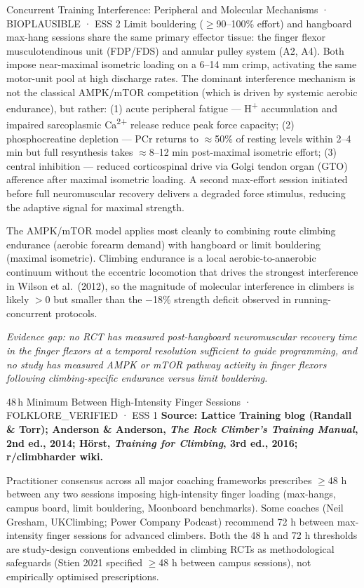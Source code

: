 \begin{bioplausbox}{Concurrent Training Interference: Peripheral and Molecular Mechanisms · BIOPLAUSIBLE · ESS 2}
Limit bouldering ($\geq$90–100\% effort) and hangboard max-hang sessions share the same primary effector tissue: the finger flexor musculotendinous unit (FDP/FDS) and annular pulley system (A2, A4). Both impose near-maximal isometric loading on a 6–14 mm crimp, activating the same motor-unit pool at high discharge rates. The dominant interference mechanism is not the classical AMPK/mTOR competition (which is driven by systemic aerobic endurance), but rather: (1) acute peripheral fatigue — H\textsuperscript{+} accumulation and impaired sarcoplasmic Ca\textsuperscript{2+} release reduce peak force capacity; (2) phosphocreatine depletion — PCr returns to $\approx$50\% of resting levels within 2–4 min but full resynthesis takes $\approx$8–12 min post-maximal isometric effort; (3) central inhibition — reduced corticospinal drive via Golgi tendon organ (GTO) afference after maximal isometric loading. A second max-effort session initiated before full neuromuscular recovery delivers a degraded force stimulus, reducing the adaptive signal for maximal strength.

The AMPK/mTOR model applies most cleanly to combining route climbing endurance (aerobic forearm demand) with hangboard or limit bouldering (maximal isometric). Climbing endurance is a local aerobic-to-anaerobic continuum without the eccentric locomotion that drives the strongest interference in Wilson et al.\ (2012), so the magnitude of molecular interference in climbers is likely $>0$ but smaller than the $-$18\% strength deficit observed in running-concurrent protocols.

\textit{Evidence gap: no RCT has measured post-hangboard neuromuscular recovery time in the finger flexors at a temporal resolution sufficient to guide programming, and no study has measured AMPK or mTOR pathway activity in finger flexors following climbing-specific endurance versus limit bouldering.}
\end{bioplausbox}

\begin{folklorebox}{48\,h Minimum Between High-Intensity Finger Sessions · FOLKLORE\_VERIFIED · ESS 1}
\textbf{Source: Lattice Training blog (Randall \& Torr); Anderson \& Anderson, \textit{The Rock Climber's Training Manual}, 2nd ed., 2014; Hörst, \textit{Training for Climbing}, 3rd ed., 2016; r/climbharder wiki.}

Practitioner consensus across all major coaching frameworks prescribes $\geq$48 h between any two sessions imposing high-intensity finger loading (max-hangs, campus board, limit bouldering, Moonboard benchmarks). Some coaches (Neil Gresham, UKClimbing; Power Company Podcast) recommend 72 h between max-intensity finger sessions for advanced climbers. Both the 48 h and 72 h thresholds are study-design conventions embedded in climbing RCTs as methodological safeguards (Stien 2021 specified $\geq$48 h between campus sessions), not empirically optimised prescriptions.
\end{folklorebox}

